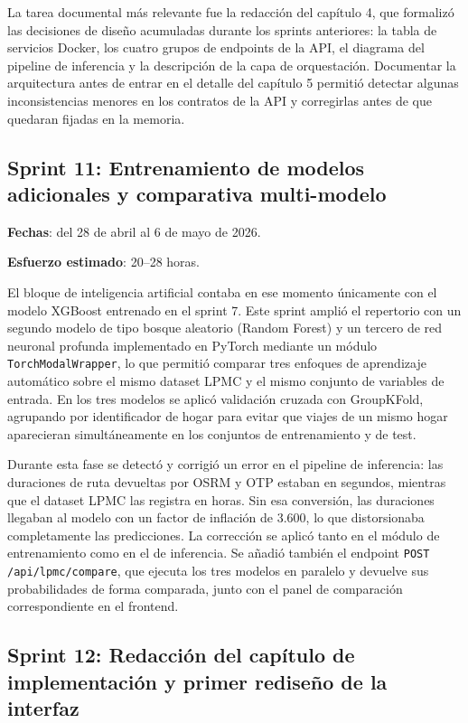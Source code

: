 La tarea documental más relevante fue la redacción del capítulo 4, que formalizó las decisiones de diseño acumuladas durante los sprints anteriores: la tabla de servicios Docker, los cuatro grupos de endpoints de la API, el diagrama del pipeline de inferencia y la descripción de la capa de orquestación. Documentar la arquitectura antes de entrar en el detalle del capítulo 5 permitió detectar algunas inconsistencias menores en los contratos de la API y corregirlas antes de que quedaran fijadas en la memoria.

\subsection{Sprint 11: Entrenamiento de modelos adicionales y comparativa multi-modelo}

\textbf{Fechas}: del 28 de abril al 6 de mayo de 2026.

\textbf{Esfuerzo estimado}: 20--28 horas.

El bloque de inteligencia artificial contaba en ese momento únicamente con el modelo XGBoost entrenado en el sprint 7. Este sprint amplió el repertorio con un segundo modelo de tipo bosque aleatorio (Random Forest) y un tercero de red neuronal profunda implementado en PyTorch mediante un módulo \texttt{TorchModalWrapper}, lo que permitió comparar tres enfoques de aprendizaje automático sobre el mismo dataset LPMC y el mismo conjunto de variables de entrada. En los tres modelos se aplicó validación cruzada con GroupKFold, agrupando por identificador de hogar para evitar que viajes de un mismo hogar aparecieran simultáneamente en los conjuntos de entrenamiento y de test.

Durante esta fase se detectó y corrigió un error en el pipeline de inferencia: las duraciones de ruta devueltas por OSRM y OTP estaban en segundos, mientras que el dataset LPMC las registra en horas. Sin esa conversión, las duraciones llegaban al modelo con un factor de inflación de 3.600, lo que distorsionaba completamente las predicciones. La corrección se aplicó tanto en el módulo de entrenamiento como en el de inferencia. Se añadió también el endpoint \texttt{POST /api/lpmc/compare}, que ejecuta los tres modelos en paralelo y devuelve sus probabilidades de forma comparada, junto con el panel de comparación correspondiente en el frontend.

\subsection{Sprint 12: Redacción del capítulo de implementación y primer rediseño de la interfaz}

